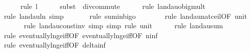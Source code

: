 \begin{isabellebody}
\ \ \ \ \isamarkupfalse%
\ {\isacharparenleft}{\kern0pt}rule\ l{}{\isacharparenright}{\kern0pt}\isanewline
\ \ \ \ \isamarkupfalse%
\ {\isacharparenleft}{\kern0pt}subst\ {\isacharparenleft}{\kern0pt}{}{\isacharparenright}{\kern0pt}\ div{\isacharunderscore}{\kern0pt}commute{\isacharparenright}{\kern0pt}\isanewline
\ \ \ \ \isamarkupfalse%
\ {\isacharparenleft}{\kern0pt}rule\ landau{\isacharunderscore}{\kern0pt}o{\isachardot}{\kern0pt}big{\isacharunderscore}{\kern0pt}mult{\isacharunderscore}{\kern0pt}{}{\isacharparenright}{\kern0pt}\isanewline
\ \ \ \ \ \isamarkupfalse%
\ {\isacharparenleft}{\kern0pt}rule\ landau{\isacharunderscore}{\kern0pt}ln{\isacharunderscore}{\kern0pt}{}{\isacharcomma}{\kern0pt}\ simp{\isacharparenright}{\kern0pt}\isanewline
\ \ \ \ \ \isamarkupfalse%
\ {\isacharparenleft}{\kern0pt}rule\ sum{\isacharunderscore}{\kern0pt}in{\isacharunderscore}{\kern0pt}bigo{\isacharparenright}{\kern0pt}\isanewline
\ \ \ \ \ \ \isamarkupfalse%
\ {\isacharparenleft}{\kern0pt}rule\ landau{\isacharunderscore}{\kern0pt}nat{\isacharunderscore}{\kern0pt}ceil{\isacharbrackleft}{\kern0pt}OF\ unit{\isacharunderscore}{\kern0pt}{}{\isacharbrackright}{\kern0pt}{\isacharparenright}{\kern0pt}\isanewline
\ \ \ \ \ \isamarkupfalse%
\ {\isacharparenleft}{\kern0pt}rule\ landau{\isacharunderscore}{\kern0pt}const{\isacharunderscore}{\kern0pt}inv{\isacharcomma}{\kern0pt}\ simp{\isacharcomma}{\kern0pt}\ simp{\isacharcomma}{\kern0pt}\ rule\ unit{\isacharunderscore}{\kern0pt}{}{\isacharparenright}{\kern0pt}\isanewline
\ \ \ \ \isamarkupfalse%
\ {\isacharparenleft}{\kern0pt}rule\ landau{\isacharunderscore}{\kern0pt}sum{\isacharunderscore}{\kern0pt}{}{\isacharparenright}{\kern0pt}\isanewline
\ \ \ \ \ \ \isamarkupfalse%
\ {\isacharparenleft}{\kern0pt}rule\ eventually{\isacharunderscore}{\kern0pt}ln{\isacharunderscore}{\kern0pt}ge{\isacharunderscore}{\kern0pt}iff{\isacharbrackleft}{\kern0pt}OF\ eventually{\isacharunderscore}{\kern0pt}ln{\isacharunderscore}{\kern0pt}ge{\isacharunderscore}{\kern0pt}iff{\isacharbrackleft}{\kern0pt}OF\ n{\isacharunderscore}{\kern0pt}inf{\isacharbrackright}{\kern0pt}{\isacharbrackright}{\kern0pt}{\isacharparenright}{\kern0pt}\isanewline
\ \ \ \ \ \isamarkupfalse%
\ {\isacharparenleft}{\kern0pt}rule\ eventually{\isacharunderscore}{\kern0pt}ln{\isacharunderscore}{\kern0pt}ge{\isacharunderscore}{\kern0pt}iff{\isacharbrackleft}{\kern0pt}OF\ delta{\isacharunderscore}{\kern0pt}inf{\isacharbrackright}{\kern0pt}{\isacharparenright}{\kern0pt}\isanewline

\end{isabellebody}
